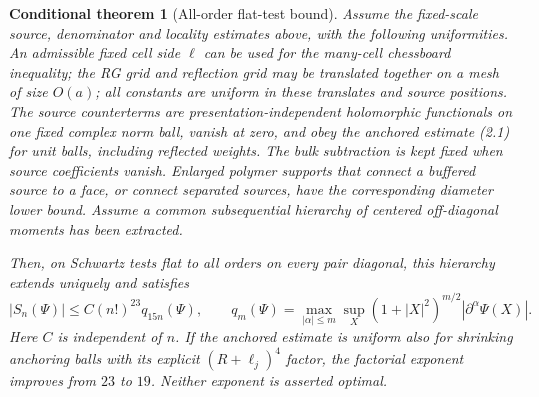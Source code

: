 \documentclass[11pt]{article}
\newtheorem{theorem}[proposition]{Conditional theorem}
\theoremstyle{remark}
\begin{document}
\begin{theorem}[All-order flat-test bound]
Assume the fixed-scale source, denominator and locality estimates above,
with the following uniformities. An admissible fixed cell side $\ell$
can be used for the many-cell chessboard inequality; the RG grid and
reflection grid may be translated together on a mesh of size $O(a)$;
all constants are uniform in these translates and source positions.
The source counterterms are presentation-independent holomorphic
functionals on one fixed complex norm ball, vanish at zero, and obey
the anchored estimate (2.1) for unit balls, including reflected weights.
The bulk subtraction is kept fixed when source coefficients vanish.
Enlarged polymer supports that connect a buffered source to a face,
or connect separated sources, have the corresponding diameter lower
bound. Assume a common subsequential hierarchy of centered off-diagonal
moments has been extracted.

Then, on Schwartz tests flat to all orders on every pair diagonal,
this hierarchy extends uniquely and satisfies
\[
 |S_n(\Psi)|\leq C(n!)^{23}q_{15n}(\Psi),\qquad
 q_m(\Psi)=\max_{|\alpha|\leq m}\sup_X
       (1+|X|^2)^{m/2}|\partial^\alpha\Psi(X)|.
 \tag{3.2}
\]
Here $C$ is independent of $n$. If the anchored estimate is uniform
also for shrinking anchoring balls with its explicit $(R+\ell_j)^4$
factor, the factorial exponent improves from $23$ to $19$.
Neither exponent is asserted optimal.
\end{theorem}
\end{document}
